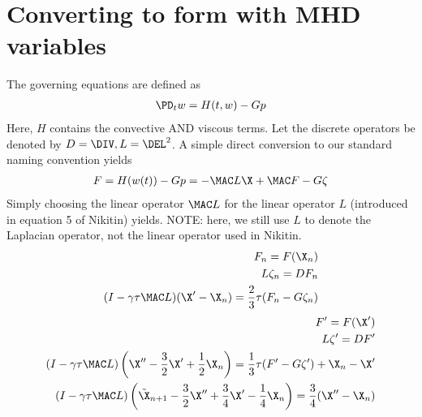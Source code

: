 \documentclass[11pt]{article}
\begin{document}
\MOONSTITLE

\section{Converting to form with MHD variables} \label{sec:MHD_form}
The governing equations are defined as
\begin{equation}\begin{aligned}
  \PD_t w = H(t,w) - G p \\
\end{aligned}\end{equation}
Here, $H$ contains the convective AND viscous terms. Let the discrete operators be denoted by $D = \DIV, L = \DEL^2$. A simple direct conversion to our standard naming convention yields
\begin{equation}\begin{aligned}
  F = H(w(t)) - G p = - \MAC L \X + \MAC F - G \zeta \\
\end{aligned}\end{equation}
Simply choosing the linear operator $\MAC L$ for the linear operator $L$ (introduced in equation 5 of Nikitin) yields. NOTE: here, we still use $L$ to denote the Laplacian operator, not the linear operator used in Nikitin.
\begin{equation}\begin{aligned}
  F_n = F(\X_n) \\
  L \zeta_n = D F_n \\
  (I - \gamma \tau \MAC L) (\X' - \X_n) = \frac{2}{3} \tau (F_n - G \zeta_n) \\
\end{aligned}\end{equation}
\begin{equation}\begin{aligned}
  F' = F(\X') \\
  L \zeta' = D F' \\
  (I - \gamma \tau \MAC L) \left(\X'' - \frac{3}{2}\X' + \frac{1}{2} \X_n \right) = \frac{1}{3} \tau (F' - G \zeta') + \X_n - \X' \\
  (I - \gamma \tau \MAC L) \left(\tilde{\X}_{n+1} - \frac{3}{2}\X'' + \frac{3}{4} \X' - \frac{1}{4}\X_n\right) = \frac{3}{4} (\X'' - \X_n) \\
\end{aligned}\end{equation}
\end{document}
